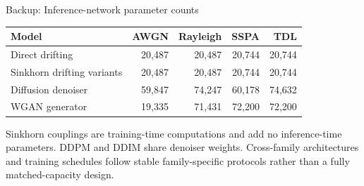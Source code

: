 \documentclass[aspectratio=169,10pt]{beamer}
\begin{document}
\begin{frame}{Backup: Inference-network parameter counts}
\scriptsize
\centering
\renewcommand{\arraystretch}{1.3}
\begin{tabular}{lrrrr}
\toprule
Model & AWGN & Rayleigh & SSPA & TDL\\
\midrule
Direct drifting & 20,487 & 20,487 & 20,744 & 20,744\\
Sinkhorn drifting variants & 20,487 & 20,487 & 20,744 & 20,744\\
Diffusion denoiser & 59,847 & 74,247 & 60,178 & 74,632\\
WGAN generator & 19,335 & 71,431 & 72,200 & 72,200\\
\bottomrule
\end{tabular}
\vspace{0.55cm}
\begin{minipage}{0.9\textwidth}
\small Sinkhorn couplings are training-time computations and add no inference-time parameters. DDPM and DDIM share denoiser weights. Cross-family architectures and training schedules follow stable family-specific protocols rather than a fully matched-capacity design.
\end{minipage}
\end{frame}
\end{document}

